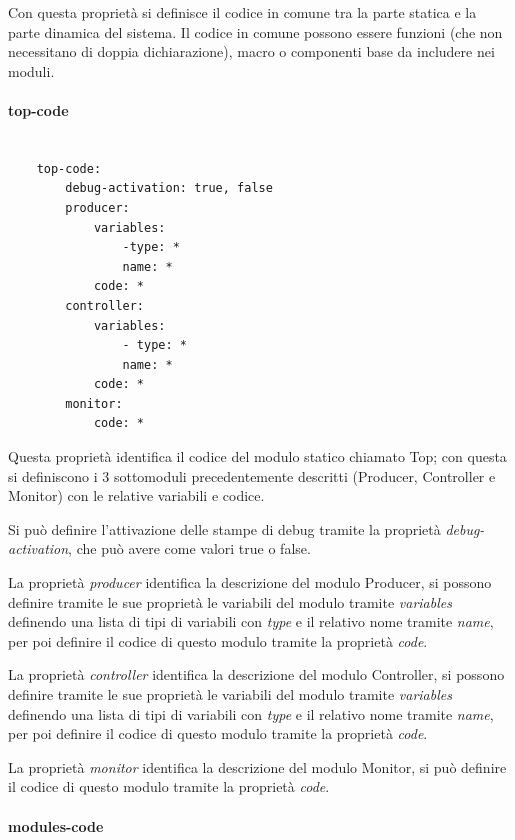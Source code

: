 \documentclass[a4paper,titlepage]{book}
\begin{document}
Con questa proprietà si definisce il codice in comune tra la parte statica e la parte dinamica del sistema. Il codice in comune possono essere funzioni (che non necessitano di doppia dichiarazione), macro o componenti base da includere nei moduli.

\paragraph{top-code}

\begin{lstlisting}[frame=single]

	top-code:
		debug-activation: true, false
		producer:
			variables:
				-type: *
				name: *
			code: *
		controller:
			variables:
				- type: *
				name: *
			code: *
		monitor:
			code: *

\end{lstlisting}

Questa proprietà identifica il codice del modulo statico chiamato Top; con questa si definiscono i 3 sottomoduli precedentemente descritti (Producer, Controller e Monitor) con le relative variabili e codice.

Si può definire l'attivazione delle stampe di debug tramite la proprietà \textit{debug-activation}, che può avere come valori true o false.

La proprietà \textit{producer} identifica la descrizione del modulo Producer, si possono definire tramite le sue proprietà le variabili del modulo tramite \textit{variables} definendo una lista di tipi di variabili con \textit{type} e il relativo nome tramite \textit{name}, per poi definire il codice di questo modulo tramite la proprietà \textit{code}.

La proprietà \textit{controller} identifica la descrizione del modulo Controller, si possono definire tramite le sue proprietà le variabili del modulo tramite \textit{variables} definendo una lista di tipi di variabili con \textit{type} e il relativo nome tramite \textit{name}, per poi definire il codice di questo modulo tramite la proprietà \textit{code}.

La proprietà \textit{monitor} identifica la descrizione del modulo Monitor, si può definire il codice di questo modulo tramite la proprietà \textit{code}.


\paragraph{modules-code}
\end{document}
